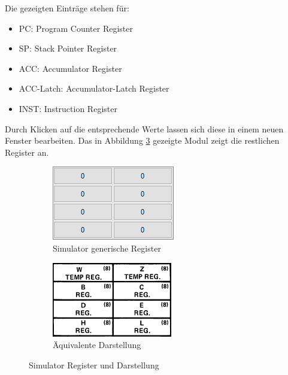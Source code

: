 \documentclass[12pt]{article}
\newcommand{\imgSpaceBefore}{\vspace{10pt}}
\begin{document}
\noindent
Die gezeigten Einträge stehen für:\imgSpaceBefore

\begin{itemize}
	\item PC: Program Counter Register
	\item SP: Stack Pointer Register
	\item ACC: Accumulator Register
	\item ACC-Latch: Accumulator-Latch Register
	\item INST: Instruction Register
\end{itemize}

\noindent
Durch Klicken auf die entsprechende Werte lassen sich diese in einem neuen Fenster bearbeiten.
Das in Abbildung \ref{fig:GenReg} gezeigte Modul zeigt die restlichen Register an.\imgSpaceBefore

\begin{figure}[h]
\centering
\begin{subfigure}{.5\textwidth}
  \centering
  \includegraphics[width=.7\linewidth]{bilder/GenericRegister_sim}
  \caption{Simulator generische Register}
  \label{fig:GenReg_s}
\end{subfigure}%
\begin{subfigure}{.5\textwidth}
  \centering
  \includegraphics[width=.7\linewidth]{bilder/GenericRegister_pic}
  \caption{Äquivalente Darstellung}
  \label{fig:GenReg_p}
\end{subfigure}
\caption{Simulator Register und Darstellung}
\label{fig:GenReg}
\end{figure}
\end{document}
